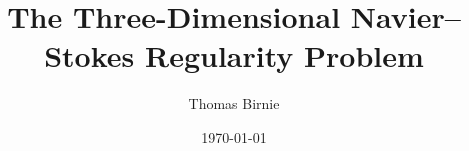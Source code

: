 \title{The Three-Dimensional Navier--Stokes Regularity Problem}
\author{Thomas Birnie}
\date{\today}

\makeatletter
{}
\makeatother
